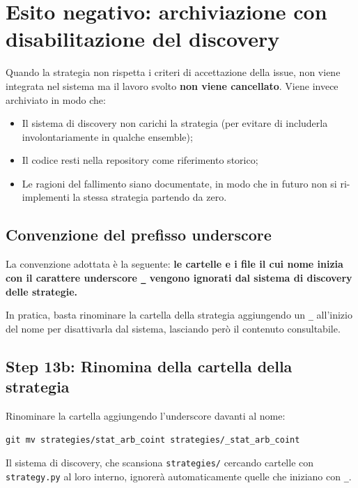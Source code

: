 \section{Esito negativo: archiviazione con disabilitazione del discovery}
\label{sec:esito_negativo}

Quando la strategia non rispetta i criteri di accettazione della issue, non viene integrata nel sistema ma il lavoro svolto \textbf{non viene cancellato}. Viene invece archiviato in modo che:

\begin{itemize}
  \item Il sistema di discovery non carichi la strategia (per evitare di includerla involontariamente in qualche ensemble);
  \item Il codice resti nella repository come riferimento storico;
  \item Le ragioni del fallimento siano documentate, in modo che in futuro non si ri-implementi la stessa strategia partendo da zero.
\end{itemize}

\subsection{Convenzione del prefisso underscore}

La convenzione adottata è la seguente: \textbf{le cartelle e i file il cui nome inizia con il carattere underscore \texttt{\_} vengono ignorati dal sistema di discovery delle strategie.}

In pratica, basta rinominare la cartella della strategia aggiungendo un \texttt{\_} all'inizio del nome per disattivarla dal sistema, lasciando però il contenuto consultabile.

\subsection{Step 13b: Rinomina della cartella della strategia}

Rinominare la cartella aggiungendo l'underscore davanti al nome:

\begin{lstlisting}
git mv strategies/stat_arb_coint strategies/_stat_arb_coint
\end{lstlisting}

Il sistema di discovery, che scansiona \texttt{strategies/} cercando cartelle con \texttt{strategy.py} al loro interno, ignorerà automaticamente quelle che iniziano con \texttt{\_}.

